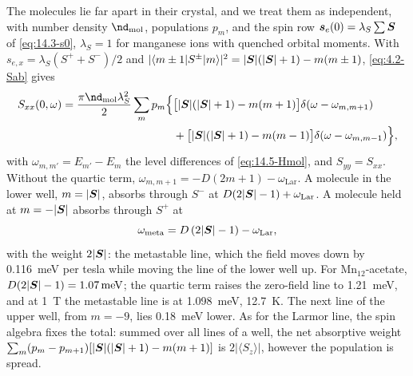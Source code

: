 The molecules lie far apart in their crystal, and we treat them as independent, with number density $\nd_{\mathrm{mol}}$, populations $p_m$, and the spin row $\bm{s}_e(0) = \lambda_S\sum\bm{S}$ of \cref{eq:14.3-s0}, $\lambda_S = 1$ for manganese ions with quenched orbital moments. With $s_{e,x} = \lambda_S(S^+ + S^-)/2$ and $|\langle m \pm 1|S^\pm|m\rangle|^2 = |\bm{S}|(|\bm{S}| + 1) - m(m \pm 1)$, \cref{eq:4.2-Sab} gives
\begin{equation}
  \begin{split}
  S_{xx}(0,\omega) = \frac{\pi\nd_{\mathrm{mol}}\lambda_S^2}{2}\sum_mp_m\Bigl\{&\bigl[|\vect{S}|(|\vect{S}| + 1) - m(m + 1)\bigr]\delta(\omega - \omega_{m,m+1}) \\
  &+ \bigl[|\vect{S}|(|\vect{S}| + 1) - m(m - 1)\bigr]\delta(\omega - \omega_{m,m-1})\Bigr\} ,
  \end{split}
  \label{eq:14.5-smm}
\end{equation}
with $\omega_{m,m'} = E_{m'} - E_m$ the level differences of \cref{eq:14.5-Hmol}, and $S_{yy} = S_{xx}$. Without the quartic term, $\omega_{m,m+1} = -D(2m + 1) - \omega_{\mathrm{Lar}}$. A molecule in the lower well, $m = |\bm{S}|$, absorbs through $S^-$ at $D(2|\bm{S}| - 1) + \omega_{\mathrm{Lar}}$. A molecule held at $m = -|\bm{S}|$ absorbs through $S^+$ at
\begin{equation}
  \omega_{\mathrm{meta}} = D\,(2|\bm{S}| - 1) - \omega_{\mathrm{Lar}} ,
  \label{eq:14.5-meta}
\end{equation}
with the weight $2|\bm{S}|$: the metastable line, which the field moves down by \SI{0.116}{meV} per tesla while moving the line of the lower well up. For Mn$_{12}$-acetate, $D(2|\bm{S}| - 1) = \SI{1.07}{meV}$; the quartic term raises the zero-field line to \SI{1.21}{meV}, and at \SI{1}{T} the metastable line is at \SI{1.098}{meV}, \SI{12.7}{K}. The next line of the upper well, from $m = -9$, lies \SI{0.18}{meV} lower. As for the Larmor line, the spin algebra fixes the total: summed over all lines of a well, the net absorptive weight $\sum_m(p_m - p_{m+1})[|\bm{S}|(|\bm{S}| + 1) - m(m + 1)]$ is $2|\langle S_z\rangle|$, however the population is spread.

